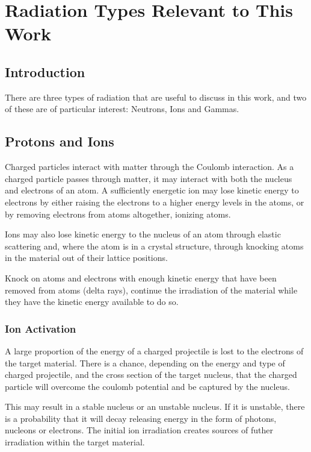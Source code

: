 \section{Radiation Types Relevant to This Work}


\subsection{Introduction}

There are three types of radiation that are useful to discuss in this work, and two of these are of particular interest: Neutrons, Ions and Gammas.




\subsection{Protons and Ions}

Charged particles interact with matter through the Coulomb interaction.  As a charged particle passes through matter, it may interact with both the nucleus and electrons of an atom.  A sufficiently energetic ion may lose kinetic energy to electrons by either raising the electrons to a higher energy levels in the atoms, or by removing electrons from atoms altogether, ionizing atoms.  

Ions may also lose kinetic energy to the nucleus of an atom through elastic scattering and, where the atom is in a crystal structure, through knocking atoms in the material out of their lattice positions.

Knock on atoms and electrons with enough kinetic energy that have been removed from atoms (delta rays), continue the irradiation of the material while they have the kinetic energy available to do so.


\subsubsection{Ion Activation}

A large proportion of the energy of a charged projectile is lost to the electrons of the target material.  There is a chance, depending on the energy and type of charged projectile, and the cross section of the target nucleus, that the charged particle will overcome the coulomb potential and be captured by the nucleus.

This may result in a stable nucleus or an unstable nucleus.  If it is unstable, there is a probability that it will decay releasing energy in the form of photons, nucleons or electrons.  The initial ion irradiation creates sources of futher irradiation within the target material.




